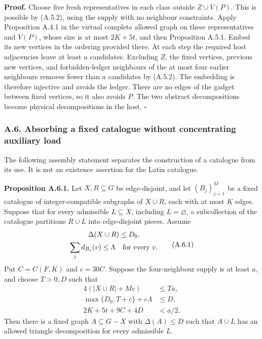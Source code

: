 \documentclass[english,11pt,a4paper]{article}
\begin{document}
\textbf{Proof.} Choose five fresh representatives in each class outside \(Z\cup V(P)\). This is possible by (A.5.2), using the supply with no neighbour constraints. Apply Proposition A.4.1 in the virtual complete allowed graph on these representatives and \(V(P)\), whose size is at most \(2K+5t\), and then Proposition A.5.1. Embed its new vertices in the ordering provided there. At each step the required host adjacencies leave at least \(a\) candidates. Excluding \(Z\), the fixed vertices, previous new vertices, and forbidden-ledger neighbours of the at most four earlier neighbours removes fewer than \(a\) candidates by (A.5.2). The embedding is therefore injective and avoids the ledger. There are no edges of the gadget between fixed vertices, so it also avoids \(P\). The two abstract decompositions become physical decompositions in the host. \(\square\)

\subsubsection{A.6. Absorbing a fixed catalogue without concentrating auxiliary load}\label{a.6.-absorbing-a-fixed-catalogue-without-concentrating-auxiliary-load}

The following assembly statement separates the construction of a catalogue from its use. It is not an existence assertion for the Latin catalogue.

\textbf{Proposition A.6.1.} Let \(X,R\subseteq G\) be edge-disjoint, and let \((B_j)_{j=1}^M\) be a fixed catalogue of integer-compatible subgraphs of \(X\cup R\), each with at most \(K\) edges. Suppose that for every admissible \(L\subseteq X\), including \(L=\varnothing\), a subcollection of the catalogue partitions \(R\cup L\) into edge-disjoint pieces. Assume \[\begin{gathered}
\Delta(X\cup R)\le D_0,\\
\sum_j d_{B_j}(v)\le\Lambda\quad\hbox{for every }v.
\end{gathered}
\tag{A.6.1}\] Put \(C=C(F,K)\) and \(c=30C\). Suppose the four-neighbour supply is at least \(a\), and choose \(T>0,D\) such that \[\begin{split}
4(|X\cup R|+Mc)&\le Ta,\\
\max\{D_0,T+c\}+c\Lambda&\le D,\\
2K+5t+9C+4D&<a/2.
\end{split}
\tag{A.6.2}\] Then there is a fixed graph \(A\subseteq G-X\) with \(\Delta(A)\le D\) such that \(A\cup L\) has an allowed triangle decomposition for every admissible \(L\).
\end{document}
